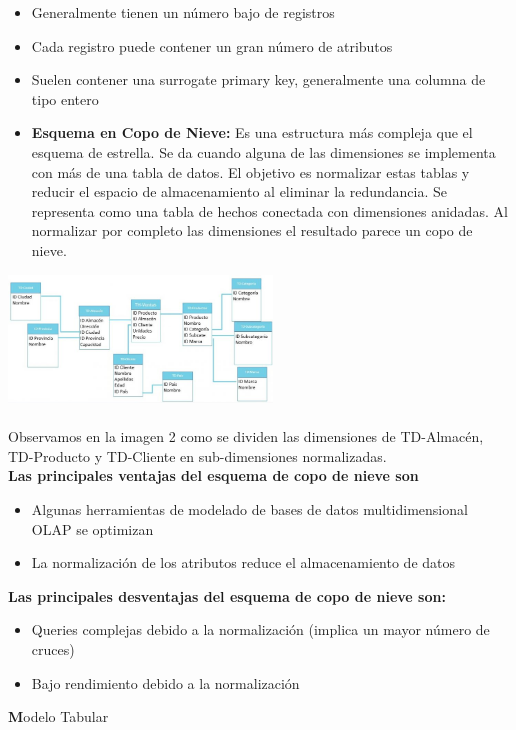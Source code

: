 \documentclass[twoside,twocolumn]{article}
\begin{document}
\begin{enumerate}
\begin{itemize}
\item Generalmente tienen un número bajo de registros
\item Cada registro puede contener un gran número de atributos
\item Suelen contener una surrogate primary key, generalmente una columna de tipo entero


\item \textbf{Esquema en Copo de Nieve:} 
Es una estructura más compleja que el esquema de estrella. Se da cuando alguna de las dimensiones se implementa con más de una tabla de datos.
El objetivo es normalizar estas tablas y reducir el espacio de almacenamiento al eliminar la redundancia.
Se representa como una tabla de hechos conectada con dimensiones anidadas. Al normalizar por completo las dimensiones el resultado parece un copo de nieve.
\end{itemize}
\includegraphics[width=7cm]{Imagenes/2.jpg}
\textbf{ {\small}}
\\ \\

Observamos en la imagen 2 como se dividen las dimensiones de TD-Almacén, TD-Producto y TD-Cliente en sub-dimensiones normalizadas.\\


\textbf{Las principales ventajas del esquema de copo de nieve son}
\begin{itemize}
\item Algunas herramientas de modelado de bases de datos multidimensional OLAP se optimizan
\item La normalización de los atributos reduce el almacenamiento de datos
\end{itemize}
\textbf{Las principales desventajas del esquema de copo de nieve son:}
\begin{itemize}
\item Queries complejas debido a la normalización (implica un mayor número de cruces)
\item Bajo rendimiento debido a la normalización
\end{itemize}


   
\textbf Modelo Tabular \\ 



\end{enumerate}
\end{document}
